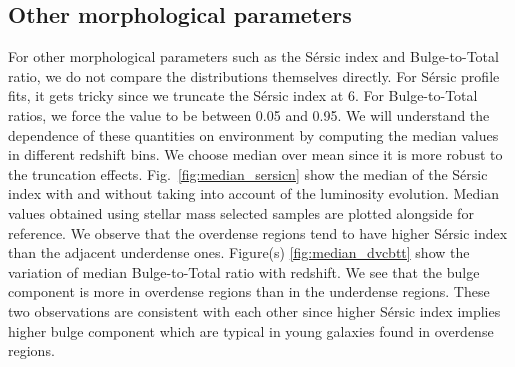 \documentclass[twocolumn,useAMS,usenatbib]{mn2e}
\newcommand{\arun}[1]{{\textcolor{blue}{#1}}}
\newcommand{\sersic}{S\'{e}rsic }
\newcommand{\btt}{Bulge-to-Total }
\begin{document}
\subsection{Other morphological parameters}
For other morphological parameters such as the \sersic index and \btt ratio, we do not compare the distributions themselves directly. 
For \sersic profile fits, it gets tricky since we truncate the \sersic index at 6. 
For \btt ratios, we force the value to be between 0.05 and 0.95. %
We will understand the dependence of these quantities on environment by computing the median values in different redshift bins.
We choose median over mean since it is more robust to the truncation effects.
Fig.~\ref{fig:median_sersicn} show the median of the \sersic index with and without taking into account of the luminosity evolution. Median values obtained using stellar mass selected samples are plotted alongside for reference.
We observe that the overdense regions tend to have higher \sersic index than the adjacent underdense ones.
Figure(s) \ref{fig:median_dvcbtt} show the variation of median \btt ratio with redshift. We see that the bulge component is more in overdense regions than in the underdense regions.
These two observations are consistent with each other since higher \sersic index implies higher bulge component which are typical in young galaxies found in overdense regions.
\end{document}
